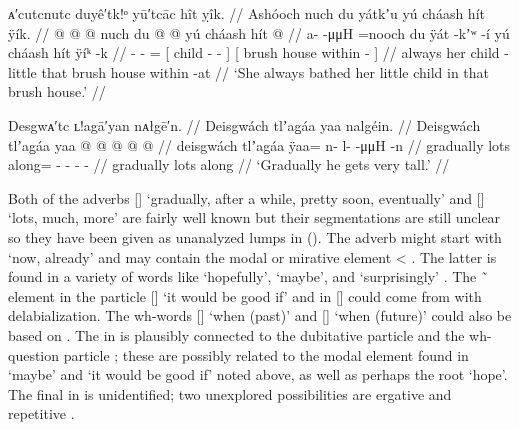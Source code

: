 \ex\label{ex:89-111-always-bathed-child}%
%
\begingl
	\glpreamble	ᴀ′cutcnutc duyê′tk!ᵒ yū′tcāc hît ỵîk. //
	\glpreamble	Ashóoch nuch du yátkʼu yú cháash hít ÿík. //
	\gla	{} @ {} @ {} @ \•nuch
		{} du  @ {} @ {} {}
		{} yú cháash hít  @ {} {} //
	\glb	a-  -μμH =nooch
		{} du ÿát -kʼʷ -í {}
		{} yú cháash hít ÿíᵏ -k {} //
	\glc	{}-  - =
		{}[  child - - {}]
		{}[  brush house within - {}] //
	\gld	{} {} {} \•always
		{} her child -little {} {}
		{} that brush house within -at {} //
	\glft	‘She always bathed her little child in that brush house.’
		//
\endgl
\xe

\ex\label{ex:89-112-gradually-get-big}%
%
\begingl
	\glpreamble	Desgwᴀ′tc ʟ!agā′yan nᴀłgē′n. //
	\glpreamble	Deisgwách tlʼag̱áa yaa nalgéin. //
	\gla	Deisgwách tlʼag̱áa
		yaa @  @ {} @ {} @ {} @ {} //
	\glb	deisgwách tlʼag̱áa
		ÿaa= n- l-  -μμH -n //
	\glc	gradually lots
		along= - -  - - //
	\gld	gradually lots
		along\•  {} {} {} {} //
	\glft	‘Gradually he gets very tall.’
		//
\endgl
\xe

Both of the adverbs  [] ‘gradually, after a while, pretty soon, eventually’ \parencite[f05/208]{leer:1973} and  [] ‘lots, much, more’ \parencite[08/217]{leer:1973} are fairly well known but their segmentations are still unclear so they have been given as unanalyzed lumps in (\lastx).
The adverb  might start with  ‘now, already’ and may contain the modal or mirative element  < .
The latter is found in a variety of words like  ‘hopefully’,  ‘maybe’, and  ‘surprisingly’ \parencite[f05/185]{leer:1973}.
The  \~\  element in the particle  [] ‘it would be good if’ \parencite[10/48–50]{leer:1973} and in  [] \parencite[f05/10]{leer:1973} could come from  with delabialization.
The wh-words  [] ‘when (past)’ and  [] ‘when (future)’ could also be based on .
The  in  is plausibly connected to the dubitative particle  and the wh-question particle ; these are possibly related to the modal element  found in  ‘maybe’ and  ‘it would be good if’ noted above, as well as perhaps the root  ‘hope’.
The final  in  is unidentified; two unexplored possibilities are ergative  and repetitive .

